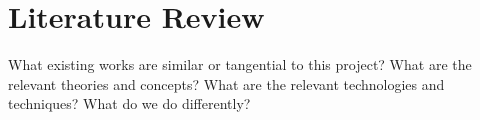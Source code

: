 \chapter*{Literature Review}

What existing works are similar or tangential to this project?
What are the relevant theories and concepts?
What are the relevant technologies and techniques?
What do we do differently?